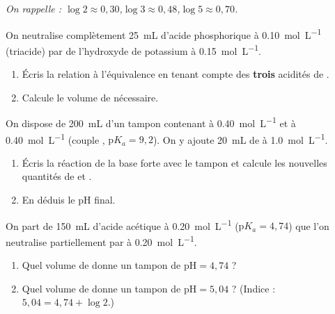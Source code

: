 \documentclass[11pt,a4paper]{article}
\begin{document}
\begin{center}\small\itshape On rappelle : $\log 2 \approx 0{,}30$,\quad $\log 3 \approx 0{,}48$,\quad $\log 5 \approx 0{,}70$.\end{center}

\begin{exo}
On neutralise complètement \qty{25}{mL} d'acide phosphorique  à \qty{0,10}{mol\per L} (triacide) par
de l'hydroxyde de potassium  à \qty{0,15}{mol\per L}.
\begin{enumerate}[label=\alph*)]
  \item Écris la relation à l'équivalence en tenant compte des \textbf{trois} acidités de .
  \item Calcule le volume de  nécessaire.
\end{enumerate}
\end{exo}

\begin{exo}
On dispose de \qty{200}{mL} d'un tampon contenant  à \qty{0,40}{mol\per L} et  à
\qty{0,40}{mol\per L} (couple , $\mathrm{p}K_a = 9{,}2$). On y ajoute \qty{20}{mL} de  à
\qty{1,0}{mol\per L}.
\begin{enumerate}[label=\alph*)]
  \item Écris la réaction de la base forte avec le tampon et calcule les nouvelles quantités de  et
        .
  \item En déduis le pH final.
\end{enumerate}
\end{exo}

\begin{exo}
On part de \qty{150}{mL} d'acide acétique  à \qty{0,20}{mol\per L} ($\mathrm{p}K_a = 4{,}74$) que
l'on neutralise partiellement par  à \qty{0,20}{mol\per L}.
\begin{enumerate}[label=\alph*)]
  \item Quel volume de  donne un tampon de $\mathrm{pH} = 4{,}74$ ?
  \item Quel volume de  donne un tampon de $\mathrm{pH} = 5{,}04$ ? (Indice : $5{,}04 = 4{,}74 + \log 2$.)
\end{enumerate}
\end{exo}
\end{document}

